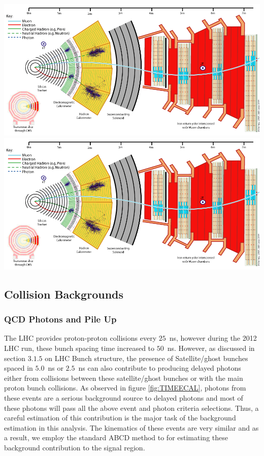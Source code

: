 \begin{center}
\centering
\includegraphics[scale=0.2]{THESISPLOTS/CMS_Slice.png}
\includegraphics[scale=0.2]{THESISPLOTS/CMS_Slice.png}
\label{fig:SPIKES}
\end{center}


\subsection{Collision Backgrounds}

\subsubsection{QCD Photons and Pile Up}
The LHC provides proton-proton collisions every $25$~ns, however during the 2012 LHC run, these bunch spacing time increased to $50$~ns. However, as discussed in section $3.1.5$ on LHC Bunch structure, the presence of 
Satellite/ghost bunches spaced in $5.0$~ns or $2.5$~ns  can also contribute to producing delayed photons either from collisions between these satellite/ghost bunches or with the main proton bunch collisions.
As observed in figure \ref{fig:TIMEECAL}, photons from these events are a serious background source to delayed photons and most of these photons will pass all the above event and photon criteria selections. Thus, a careful 
estimation of this contribution is the major task of the background estimation in this analysis.
The kinematics of these events are very similar and as a result, we employ the standard ABCD method to for estimating these background contribution  to the signal region.

